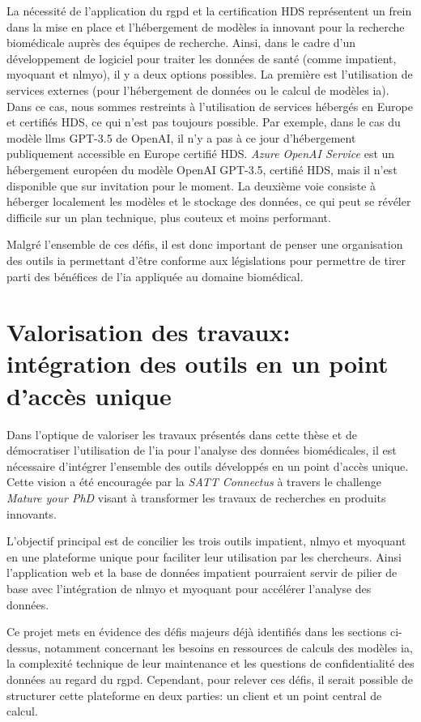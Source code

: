 La nécessité de l'application du \gls{rgpd} et la certification HDS représentent un frein dans la mise en place et l'hébergement de modèles \gls{ia} innovant pour la recherche biomédicale auprès des équipes de recherche. Ainsi, dans le cadre d'un développement de logiciel pour traiter les données de santé (comme \gls{impatient}, \gls{myoquant} et \gls{nlmyo}), il y a deux options possibles. La première est l'utilisation de services externes (pour l'hébergement de données ou le calcul de modèles \gls{ia}). Dans ce cas, nous sommes restreints à l'utilisation de services hébergés en Europe et certifiés HDS, ce qui n'est pas toujours possible. Par exemple, dans le cas du modèle \gls{llms} GPT-3.5 de OpenAI, il n'y a pas à ce jour d'hébergement publiquement accessible en Europe certifié HDS. \textit{Azure OpenAI Service} est un hébergement européen du modèle OpenAI GPT-3.5, certifié HDS, mais il n'est disponible que sur invitation pour le moment. La deuxième voie consiste à héberger localement les modèles et le stockage des données, ce qui peut se révéler difficile sur un plan technique, plus couteux et moins performant.

Malgré l'ensemble de ces défis, il est donc important de penser une organisation des outils \gls{ia} permettant d'être conforme aux législations pour permettre de tirer parti des bénéfices de l'\gls{ia} appliquée au domaine biomédical.

\section{Valorisation des travaux: intégration des outils en un point d'accès unique}
Dans l'optique de valoriser les travaux présentés dans cette thèse et de démocratiser l'utilisation de l’\gls{ia} pour l'analyse des données biomédicales, il est nécessaire d'intégrer l'ensemble des outils développés en un point d'accès unique. Cette vision a été encouragée par la \textit{SATT Connectus} à travers le challenge \textit{Mature your PhD} visant à transformer les travaux de recherches en produits innovants.

L'objectif principal est de concilier les trois outils \gls{impatient}, \gls{nlmyo} et \gls{myoquant} en une plateforme unique pour faciliter leur utilisation par les chercheurs. Ainsi l'application web et la base de données \gls{impatient} pourraient servir de pilier de base avec l'intégration de \gls{nlmyo} et \gls{myoquant} pour accélérer l'analyse des données.

Ce projet mets en évidence des défis majeurs déjà identifiés dans les sections ci-dessus, notamment concernant les besoins en ressources de calculs des modèles \gls{ia}, la complexité technique de leur maintenance et les questions de confidentialité des données au regard du \gls{rgpd}. Cependant, pour relever ces défis, il serait possible de structurer cette plateforme en deux parties: un client et un point central de calcul.

